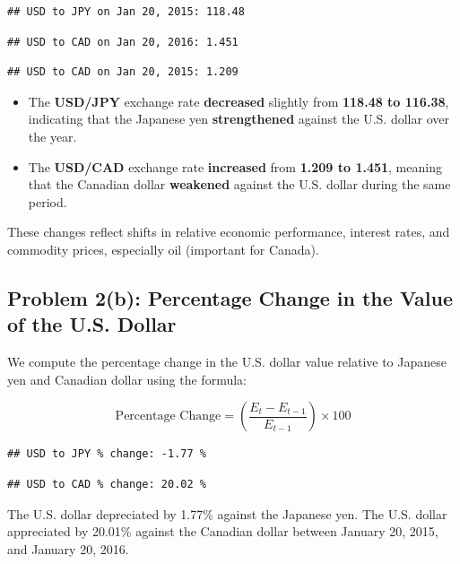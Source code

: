 \documentclass[
]{article}
\providecommand{\tightlist}{%
  \setlength{\itemsep}{0pt}\setlength{\parskip}{0pt}}
\begin{document}
\begin{verbatim}
## USD to JPY on Jan 20, 2015: 118.48
\end{verbatim}

\begin{verbatim}
## USD to CAD on Jan 20, 2016: 1.451
\end{verbatim}

\begin{verbatim}
## USD to CAD on Jan 20, 2015: 1.209
\end{verbatim}

\begin{itemize}
\tightlist
\item
  The \textbf{USD/JPY} exchange rate \textbf{decreased} slightly from
  \textbf{118.48 to 116.38}, indicating that the Japanese yen
  \textbf{strengthened} against the U.S. dollar over the year.
\item
  The \textbf{USD/CAD} exchange rate \textbf{increased} from
  \textbf{1.209 to 1.451}, meaning that the Canadian dollar
  \textbf{weakened} against the U.S. dollar during the same period.
\end{itemize}

These changes reflect shifts in relative economic performance, interest
rates, and commodity prices, especially oil (important for Canada).

\subsection{Problem 2(b): Percentage Change in the Value of the U.S.
Dollar}\label{problem-2b-percentage-change-in-the-value-of-the-u.s.-dollar}

We compute the percentage change in the U.S. dollar value relative to
Japanese yen and Canadian dollar using the formula:

\[
\text{Percentage Change} = \left( \frac{E_{t} - E_{t-1}}{E_{t-1}} \right) \times 100
\]

\begin{verbatim}
## USD to JPY % change: -1.77 %
\end{verbatim}

\begin{verbatim}
## USD to CAD % change: 20.02 %
\end{verbatim}

The U.S. dollar depreciated by 1.77\% against the Japanese yen. The U.S.
dollar appreciated by 20.01\% against the Canadian dollar between
January 20, 2015, and January 20, 2016.
\end{document}
